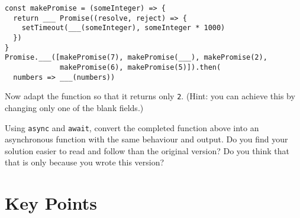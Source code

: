 \begin{verbatim}
const makePromise = (someInteger) => {
  return ___ Promise((resolve, reject) => {
    setTimeout(___(someInteger), someInteger * 1000)
  })
}
Promise.___([makePromise(7), makePromise(___), makePromise(2),
             makePromise(6), makePromise(5)]).then(
  numbers => ___(numbers))
\end{verbatim}

Now adapt the function so that it returns only \texttt{2}.
(Hint: you can achieve this by changing only one of the blank fields.)


Using \texttt{async} and \texttt{await},
convert the completed function above into an asynchronous function with the same behaviour and output.
Do you find your solution easier to read and follow than the original version?
Do you think that that is only because you wrote this version?

\section*{Key Points}


